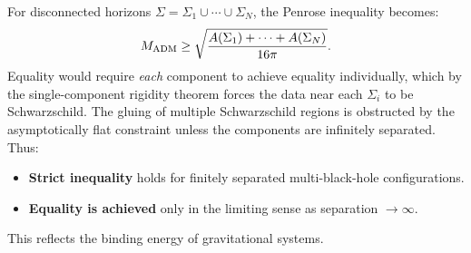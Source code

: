 \begin{remark}
For disconnected horizons $\Sigma = \Sigma_1 \cup \cdots \cup \Sigma_N$, the Penrose inequality becomes:
\begin{equation}
    M_{\mathrm{ADM}} \ge \sqrt{\frac{A(\Sigma_1) + \cdots + A(\Sigma_N)}{16\pi}}.
\end{equation}
Equality would require \emph{each} component to achieve equality individually, which by the single-component rigidity theorem forces the data near each $\Sigma_i$ to be Schwarzschild. The gluing of multiple Schwarzschild regions is obstructed by the asymptotically flat constraint unless the components are infinitely separated. Thus:
\begin{itemize}
    \item \textbf{Strict inequality} holds for finitely separated multi-black-hole configurations.
    \item \textbf{Equality is achieved} only in the limiting sense as separation $\to \infty$.
\end{itemize}
This reflects the binding energy of gravitational systems.
\end{remark}
